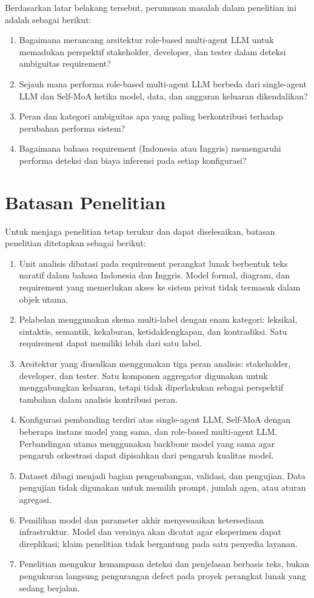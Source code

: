 Berdasarkan latar belakang tersebut, perumusan masalah dalam penelitian ini adalah sebagai berikut:
\begin{enumerate}
\item Bagaimana merancang arsitektur role-based multi-agent LLM untuk memadukan perspektif stakeholder, developer, dan tester dalam deteksi ambiguitas requirement?
\item Sejauh mana performa role-based multi-agent LLM berbeda dari single-agent LLM dan Self-MoA ketika model, data, dan anggaran keluaran dikendalikan?
\item Peran dan kategori ambiguitas apa yang paling berkontribusi terhadap perubahan performa sistem?
\item Bagaimana bahasa requirement (Indonesia atau Inggris) memengaruhi performa deteksi dan biaya inferensi pada setiap konfigurasi?
\end{enumerate}

\section{Batasan Penelitian}

Untuk menjaga penelitian tetap terukur dan dapat diselesaikan, batasan penelitian ditetapkan sebagai berikut:
\begin{enumerate}
\item Unit analisis dibatasi pada requirement perangkat lunak berbentuk teks naratif dalam bahasa Indonesia dan Inggris. Model formal, diagram, dan requirement yang memerlukan akses ke sistem privat tidak termasuk dalam objek utama.
\item Pelabelan menggunakan skema multi-label dengan enam kategori: leksikal, sintaktis, semantik, kekaburan, ketidaklengkapan, dan kontradiksi. Satu requirement dapat memiliki lebih dari satu label.
\item Arsitektur yang diusulkan menggunakan tiga peran analisis: stakeholder, developer, dan tester. Satu komponen aggregator digunakan untuk menggabungkan keluaran, tetapi tidak diperlakukan sebagai perspektif tambahan dalam analisis kontribusi peran.
\item Konfigurasi pembanding terdiri atas single-agent LLM, Self-MoA dengan beberapa instans model yang sama, dan role-based multi-agent LLM. Perbandingan utama menggunakan backbone model yang sama agar pengaruh orkestrasi dapat dipisahkan dari pengaruh kualitas model.
\item Dataset dibagi menjadi bagian pengembangan, validasi, dan pengujian. Data pengujian tidak digunakan untuk memilih prompt, jumlah agen, atau aturan agregasi.
\item Pemilihan model dan parameter akhir menyesuaikan ketersediaan infrastruktur. Model dan versinya akan dicatat agar eksperimen dapat direplikasi; klaim penelitian tidak bergantung pada satu penyedia layanan.
\item Penelitian mengukur kemampuan deteksi dan penjelasan berbasis teks, bukan pengukuran langsung pengurangan defect pada proyek perangkat lunak yang sedang berjalan.
\end{enumerate}

